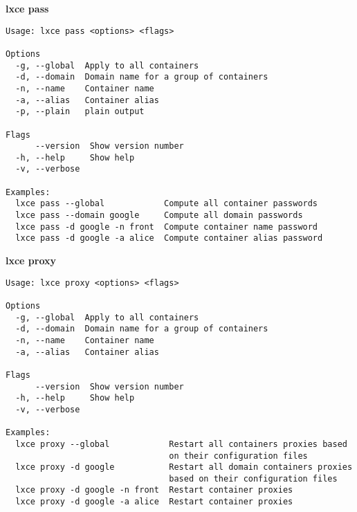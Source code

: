 \newpage
\textbf{lxce pass}
\begin{verbatim}
Usage: lxce pass <options> <flags>

Options
  -g, --global  Apply to all containers                               
  -d, --domain  Domain name for a group of containers                 
  -n, --name    Container name                                        
  -a, --alias   Container alias                                       
  -p, --plain   plain output                                          

Flags
      --version  Show version number                                  
  -h, --help     Show help                                            
  -v, --verbose

Examples:
  lxce pass --global            Compute all container passwords
  lxce pass --domain google     Compute all domain passwords
  lxce pass -d google -n front  Compute container name password
  lxce pass -d google -a alice  Compute container alias password

\end{verbatim}

\newpage
\textbf{lxce proxy}
\begin{verbatim}
Usage: lxce proxy <options> <flags>

Options
  -g, --global  Apply to all containers                                
  -d, --domain  Domain name for a group of containers                  
  -n, --name    Container name                                         
  -a, --alias   Container alias                                        

Flags
      --version  Show version number                                   
  -h, --help     Show help                                             
  -v, --verbose

Examples:
  lxce proxy --global            Restart all containers proxies based 
                                 on their configuration files
  lxce proxy -d google           Restart all domain containers proxies 
                                 based on their configuration files
  lxce proxy -d google -n front  Restart container proxies
  lxce proxy -d google -a alice  Restart container proxies
\end{verbatim}

